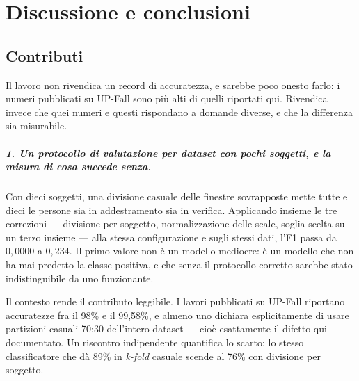 \chapter{Discussione e conclusioni}
\label{cap:conclusioni}

%
%

\section{Contributi}
\label{sec:contributi}

Il lavoro non rivendica un record di accuratezza, e sarebbe poco onesto farlo: i numeri pubblicati su UP-Fall sono più alti di quelli riportati qui. Rivendica invece che quei numeri e questi rispondano a domande diverse, e che la differenza sia misurabile.

\paragraph{1. Un protocollo di valutazione per dataset con pochi soggetti, e la misura di cosa succede senza.} Con dieci soggetti, una divisione casuale delle finestre sovrapposte mette tutte e dieci le persone sia in addestramento sia in verifica. Applicando insieme le tre correzioni --- divisione per soggetto, normalizzazione delle scale, soglia scelta su un terzo insieme --- alla stessa configurazione e sugli stessi dati, l'F1 passa da $0{,}0000$ a $0{,}234$. Il primo valore non è un modello mediocre: è un modello che non ha mai predetto la classe positiva, e che senza il protocollo corretto sarebbe stato indistinguibile da uno funzionante.

Il contesto rende il contributo leggibile. I lavori pubblicati su UP-Fall riportano accuratezze fra il 98\% e il 99,58\%, e almeno uno dichiara esplicitamente di usare partizioni casuali 70:30 dell'intero dataset --- cioè esattamente il difetto qui documentato. Un riscontro indipendente quantifica lo scarto: lo stesso classificatore che dà 89\% in \emph{k-fold} casuale scende al 76\% con divisione per soggetto.

